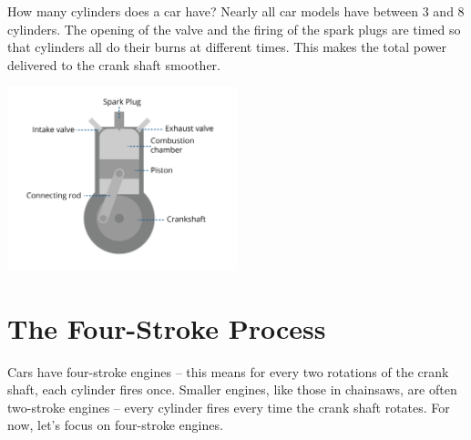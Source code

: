 How many cylinders does a car have?  Nearly all car models have between 3 and 8 cylinders.    The opening of the valve and the firing of the spark plugs are timed so that cylinders all do their burns 
at different times.   This makes the total power delivered to the crank shaft smoother.

\includegraphics[width=0.5\textwidth]{engine-08.png}


\section{The Four-Stroke Process}

Cars have four-stroke engines -- this means for every two rotations of the crank shaft,  each cylinder fires once.  Smaller engines, like those in chainsaws,  are often two-stroke engines -- every cylinder fires every time the crank shaft rotates.  For now,  let's focus on four-stroke engines.




